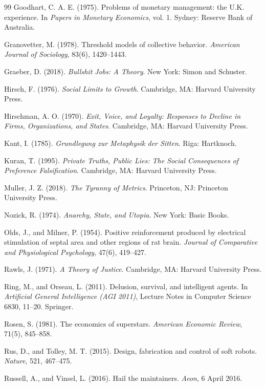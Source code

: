 \documentclass[11pt]{article}
\theoremstyle{definition}
\theoremstyle{remark}
\begin{document}
\begin{thebibliography}{99}
Goodhart, C. A. E. (1975). Problems of monetary management: the U.K. experience. In \emph{Papers in Monetary Economics}, vol. 1. Sydney: Reserve Bank of Australia.

Granovetter, M. (1978). Threshold models of collective behavior. \emph{American Journal of Sociology}, 83(6), 1420--1443.

Graeber, D. (2018). \emph{Bullshit Jobs: A Theory}. New York: Simon and Schuster.

Hirsch, F. (1976). \emph{Social Limits to Growth}. Cambridge, MA: Harvard University Press.

Hirschman, A. O. (1970). \emph{Exit, Voice, and Loyalty: Responses to Decline in Firms, Organizations, and States}. Cambridge, MA: Harvard University Press.

Kant, I. (1785). \emph{Grundlegung zur Metaphysik der Sitten}. Riga: Hartknoch.

Kuran, T. (1995). \emph{Private Truths, Public Lies: The Social Consequences of Preference Falsification}. Cambridge, MA: Harvard University Press.

Muller, J. Z. (2018). \emph{The Tyranny of Metrics}. Princeton, NJ: Princeton University Press.

Nozick, R. (1974). \emph{Anarchy, State, and Utopia}. New York: Basic Books.

Olds, J., and Milner, P. (1954). Positive reinforcement produced by electrical stimulation of septal area and other regions of rat brain. \emph{Journal of Comparative and Physiological Psychology}, 47(6), 419--427.

Rawls, J. (1971). \emph{A Theory of Justice}. Cambridge, MA: Harvard University Press.

Ring, M., and Orseau, L. (2011). Delusion, survival, and intelligent agents. In \emph{Artificial General Intelligence (AGI 2011)}, Lecture Notes in Computer Science 6830, 11--20. Springer.

Rosen, S. (1981). The economics of superstars. \emph{American Economic Review}, 71(5), 845--858.

Rus, D., and Tolley, M. T. (2015). Design, fabrication and control of soft robots. \emph{Nature}, 521, 467--475.

Russell, A., and Vinsel, L. (2016). Hail the maintainers. \emph{Aeon}, 6 April 2016.


\end{thebibliography}
\end{document}
